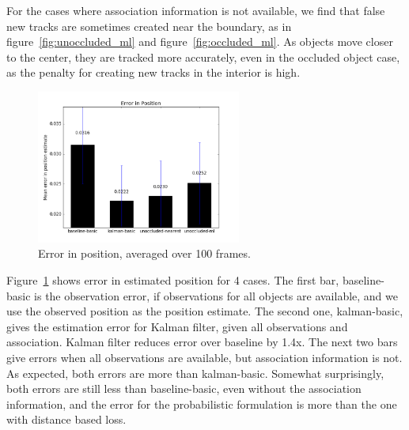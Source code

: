 \documentclass[a4paper]{article}
\begin{document}
For the cases where association information is not available, we find that
false new tracks are sometimes created near the boundary, as in
figure~\ref{fig:unoccluded_ml} and figure~\ref{fig:occluded_ml}.
As objects move closer to the center, they are tracked more accurately, even
in the occluded object case, as the penalty for creating new tracks in the
interior is high.
\begin{figure}[h]
  \centering
  \includegraphics[width=0.6\textwidth]{images/position_error.png}
  \caption{Error in position, averaged over 100 frames.}
  \label{fig:errors}
\end{figure}
Figure~\ref{fig:errors} shows error in estimated position for 4 cases.
The first bar, baseline-basic is the observation error, if observations for
all objects are available, and we use the observed position as the position estimate.
The second one, kalman-basic, gives the estimation error for Kalman
filter, given all observations and association. Kalman filter reduces error over
baseline by 1.4x. The next two bars give errors when all observations are
available, but association information is not. As expected, both errors are more
than kalman-basic. Somewhat surprisingly, both errors are still less than
baseline-basic, even without the association information, and the error for
the probabilistic formulation is more than the one with distance based loss.
\end{document}
